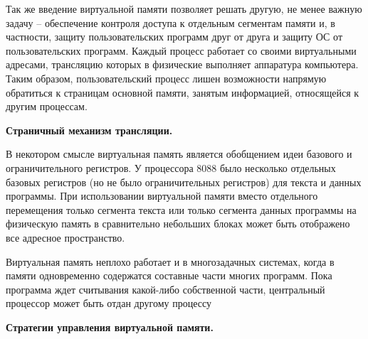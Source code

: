 Так же введение виртуальной памяти позволяет решать другую, не менее важную задачу – обеспечение контроля доступа к отдельным сегментам памяти и, в частности, защиту пользовательских программ друг от друга и защиту ОС от пользовательских программ. Каждый процесс работает со своими виртуальными адресами, трансляцию которых в физические выполняет аппаратура компьютера. Таким образом, пользовательский процесс лишен возможности напрямую обратиться к страницам основной памяти, занятым информацией, относящейся к другим процессам.

\begin{center}{\bfseries Страничный механизм трансляции.}
\end{center}

В некотором смысле виртуальная память является обобщением идеи базового и ограничительного регистров. У процессора 8088 было несколько отдельных базовых регистров (но не было ограничительных регистров) для текста и данных программы. При использовании виртуальной памяти вместо отдельного перемещения только сегмента текста или только сегмента данных программы на физическую память в сравнительно небольших блоках может быть отображено все адресное пространство. 

Виртуальная память неплохо работает и в многозадачных системах, когда в памяти одновременно содержатся составные части многих программ. Пока программа ждет считывания какой-либо собственной части, центральный процессор может быть отдан другому процессу

\begin{center}{\bfseries Стратегии управления виртуальной памяти.}
\end{center}

